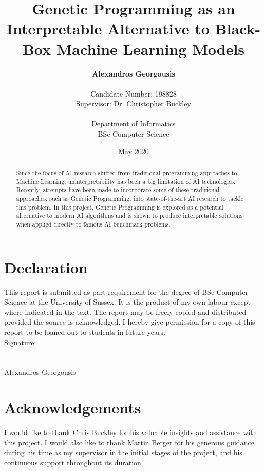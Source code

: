 \documentclass{report}
\title{\textbf{Genetic Programming as an Interpretable Alternative to Black-Box Machine Learning Models}}
\author{
    \textbf{Alexandros Georgousis}\\\\
    Candidate Number: 198828\\
    Supervisor: Dr. Christopher Buckley\\\\
    Department of Informatics\\
    BSc Computer Science
}
\date{May 2020}
\begin{document}
\begin{titlepage}
\maketitle
\end{titlepage}

\section*{Declaration}
This report is submitted as part requirement for the degree of BSc Computer Science at the University of Sussex. It is the product of my own labour except where indicated in the text. The report may be freely copied and distributed provided the source is acknowledged. I hereby give permission for a copy of this report to be loaned out to students in future years.\\

\noindent Signature:\\\\\\
Alexandros Georgousis

\clearpage

\section*{Acknowledgements}
I would like to thank Chris Buckley for his valuable insights and assistance with this project. I would also like to thank Martin Berger for his generous guidance during his time as my supervisor in the initial stages of the project, and his continuous support throughout its duration.

\begin{abstract}
Since the focus of AI research shifted from traditional programming approaches to Machine Learning, uninterpretability has been a big limitation of AI technologies. Recently, attempts have been made to incorporate some of these traditional approaches, such as Genetic Programming, into state-of-the-art AI research to tackle this problem. In this project, Genetic Programming is explored as a potential alternative to modern AI algorithms and is shown to produce interpretable solutions when applied directly to famous AI benchmark problems.
\end{abstract}
\clearpage

\tableofcontents
\listoffigures
\listoftables









\printbibliography
\end{document}
